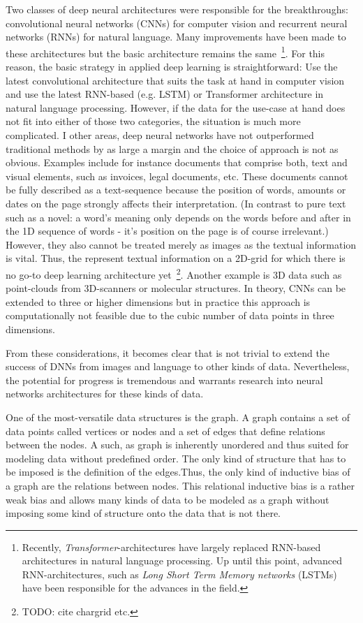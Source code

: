 Two classes of deep neural architectures were responsible for the breakthroughs: convolutional neural networks (CNNs) for computer vision and recurrent neural networks (RNNs) for natural language. Many improvements have been made to these architectures but the basic architecture remains the same~\footnote{Recently, \textit{Transformer}-architectures have largely replaced RNN-based architectures in natural language processing. Up until this point, advanced RNN-architectures, such as \textit{Long Short Term Memory networks} (LSTMs) have been responsible for the advances in the field.}. For this reason, the basic strategy in applied deep learning is straightforward: Use the latest convolutional architecture that suits the task at hand in computer vision and use the latest RNN-based (e.g. LSTM) or Transformer architecture in natural language processing. However, if the data for the use-case at hand does not fit into either of those two categories, the situation is much more complicated. I other areas, deep neural networks have not outperformed traditional methods by as large a margin and the choice of approach is not as obvious. Examples include for instance documents that comprise both, text and visual elements, such as invoices, legal documents, etc. These documents cannot be fully described as a text-sequence because the position of words, amounts or dates on the page strongly affects their interpretation. (In contrast to pure text such as a novel: a word's meaning only depends on the words before and after in the 1D sequence of words - it's position on the page is of course irrelevant.) However, they also cannot be treated merely as images as the textual information is vital. Thus, the represent textual information on a 2D-grid for which there is no go-to deep learning architecture yet~\footnote{TODO: cite chargrid etc.}. Another example is 3D data such as point-clouds from 3D-scanners or molecular structures. In theory, CNNs can be extended to three or higher dimensions but in practice this approach is computationally not feasible due to the cubic number of data points in three dimensions.

From these considerations, it becomes clear that is not trivial to extend the success of DNNs from images and language to other kinds of data. Nevertheless, the potential for progress is tremendous and warrants research into neural networks architectures for these kinds of data.

One of the most-versatile data structures is the graph. A graph contains a set of data points called vertices or nodes and a set of edges that define relations between the nodes. A such, as graph is inherently unordered and thus suited for modeling data without predefined order. The only kind of structure that has to be imposed is the definition of the edges.Thus, the only kind of inductive bias of a graph are the relations between nodes. This relational inductive bias is a rather weak bias and allows many kinds of data to be modeled as a graph without imposing some kind of structure onto the data that is not there.

